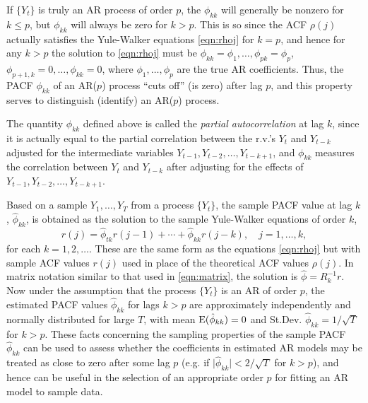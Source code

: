 If $\{ Y_t \}$ is truly an AR process of order $p$, the $\phi_{kk}$ will generally be nonzero for $k \leq p$, but $\phi_{kk}$ will always be zero for $k > p$. This is so since the ACF $\rho(j)$ actually satisfies the Yule-Walker equations \eqref{eqn:rhoj} for $k= p$, and hence for any $k > p$ the solution to \eqref{eqn:rhoj} must be $\phi_{kk}= \phi_1, \ldots, \phi_{pk}= \phi_p$, $\phi_{p+1,k} = 0, \ldots,\phi_{kk} = 0$, where $\phi_1, \ldots, \phi_p$ are the true AR coefficients. Thus, the PACF $\phi_{kk}$ of an AR($p$) process ``cuts off'' (is zero) after lag $p$, and this property serves to distinguish (identify) an AR($p$) process.


The quantity $\phi_{kk}$ defined above is called the \emph{partial autocorrelation} at lag $k$, since it is actually equal to the partial correlation between the r.v.'s $Y_t$ and $Y_{t-k}$ adjusted for the intermediate variables $Y_{t-1}, Y_{t-2}, \ldots, Y_{t-k+1}$, and $\phi_{kk}$ measures the correlation between $Y_t$ and $Y_{t-k}$ after adjusting for the effects of $Y_{t-1}, Y_{t-2}, \ldots, Y_{t-k+1}$.


Based on a sample $Y_1, \ldots, Y_T$ from a process $\{ Y_t \}$, the sample PACF value at lag $k$, $\hat{\phi}_{kk}$, is obtained as the solution to the sample Yule-Walker equations of order $k$,
	\begin{equation} \label{eqn:rjequation}
	r(j) = \hat{\phi}_{tk} r(j-1) + \cdots + \hat{\phi}_{kk} r(j-k), \quad j = 1, \ldots ,k,
	\end{equation}
for each $k= 1, 2, \ldots$. These are the same form as the equations \eqref{eqn:rhoj} but with sample ACF values $r(j)$ used in place of the theoretical ACF values $\rho(j)$. In matrix notation similar to that used in \eqref{eqn:matrix}, the solution is $\hat{\phi} = R_k^{-1} r$. Now under the assumption that the process $\{ Y_t \}$ is an AR of order $p$, the estimated PACF values $\hat{\phi}_{kk}$ for lags $k > p$ are approximately independently and normally distributed for large $T$, with mean $\operatorname{E}(\hat{\phi}_{kk})= 0$ and St.Dev. $\hat{\phi}_{kk} = 1 / \sqrt{T}$ for $k > p$. These facts concerning the sampling properties of the sample PACF $\hat{\phi}_{kk}$ can be used to assess whether the coefficients in estimated AR models may be treated as close to zero after some lag $p$ (e.g. if $\lvert \hat{\phi}_{kk} \rvert < 2 / \sqrt{T}$ for $k > p$), and hence can be useful in the selection of an appropriate order $p$ for fitting an AR model to sample data. \label{in:partac2} \twomedskip


